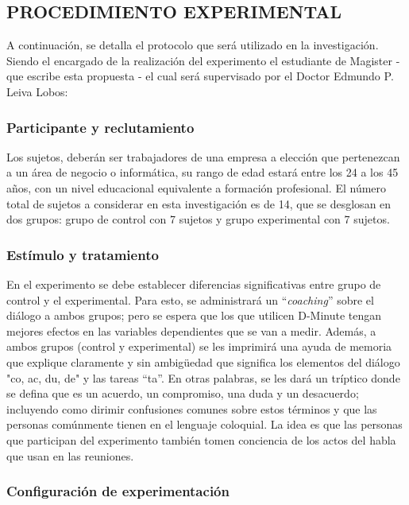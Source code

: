 \subsection{PROCEDIMIENTO EXPERIMENTAL}

A continuación, se detalla el protocolo que será utilizado en la investigación. Siendo el encargado de la realización del experimento el estudiante de Magister - que escribe esta propuesta - el cual será supervisado por el Doctor Edmundo P. Leiva Lobos:

\subsubsection{Participante y reclutamiento}

Los sujetos, deberán ser trabajadores de una empresa a elección que pertenezcan a un área de negocio o informática, su rango de edad estará entre los 24 a los 45 años, con un nivel educacional equivalente a formación profesional. El número total de sujetos a considerar en esta investigación es de 14, que se desglosan en dos grupos: grupo de control con 7 sujetos y grupo experimental con 7 sujetos.

\subsubsection{Estímulo y tratamiento}

En el experimento se debe establecer diferencias significativas entre grupo de control y el experimental. Para esto, se administrará un “\textit{coaching}” sobre el diálogo a ambos grupos; pero se espera que los que utilicen D-Minute tengan mejores efectos en las variables dependientes que se van a medir. Además, a ambos grupos (control y experimental) se les imprimirá una ayuda de memoria que explique claramente y sin ambigüedad que significa los elementos del diálogo "co, ac, du, de" y las tareas “ta”. En otras palabras, se les dará un tríptico donde se defina que es un acuerdo, un compromiso, una duda y un desacuerdo; incluyendo como dirimir confusiones comunes sobre estos términos y que las personas comúnmente tienen en el lenguaje coloquial. La idea es que las personas que participan del experimento también tomen conciencia de los actos del habla  que usan en las reuniones.

\subsubsection{Configuración de experimentación}

